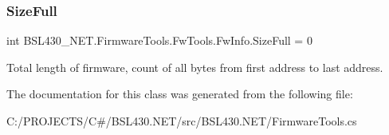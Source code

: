 \subsubsection{\texorpdfstring{SizeFull}{SizeFull}}
{\footnotesize\ttfamily int B\+S\+L430\+\_\+\+N\+E\+T.\+Firmware\+Tools.\+Fw\+Tools.\+Fw\+Info.\+Size\+Full = 0\hspace{0.3cm}{\ttfamily [get]}}



Total length of firmware, count of all bytes from first address to last address. 



The documentation for this class was generated from the following file\+:\begin{DoxyCompactItemize}
\item 
C\+:/\+P\+R\+O\+J\+E\+C\+T\+S/\+C\#/\+B\+S\+L430.\+N\+E\+T/src/\+B\+S\+L430.\+N\+E\+T/Firmware\+Tools.\+cs\end{DoxyCompactItemize}
